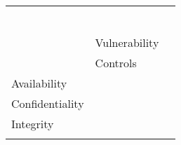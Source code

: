 \documentclass[11pt]{article}
\begin{document}
\begin{longtable}{| p{1.3in} || p{1in} | p{3.7in} |}
\begin{tabular}{p{1in} p{2.4in}}
            \end{tabular} \\
        \cline{2-3}
        & Vulnerability 
            &  \\
        \cline{2-3}
        & Controls 
            & \begin{tabular}{p{1in} p{2.4in}} 
            General 
                & \\
            Availability
                & \\
            Confidentiality 
                & \\
            Integrity
                & \\
            \end{tabular} \\
    \hline

\end{longtable}
\end{document}
